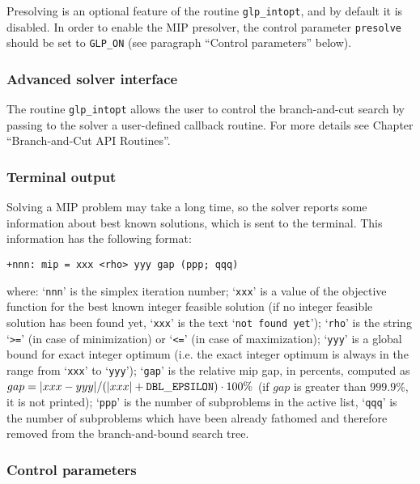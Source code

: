 Presolving is an optional feature of the routine \verb|glp_intopt|, and
by default it is disabled. In order to enable the MIP presolver, the
control parameter \verb|presolve| should be set to \verb|GLP_ON| (see
paragraph ``Control parameters'' below).

\subsubsection*{Advanced solver interface}

The routine \verb|glp_intopt| allows the user to control the
branch-and-cut search by passing to the solver a user-defined callback
routine. For more details see Chapter ``Branch-and-Cut API Routines''.

\subsubsection*{Terminal output}

Solving a MIP problem may take a long time, so the solver reports some
information about best known solutions, which is sent to the terminal.
This information has the following format:

\begin{verbatim}
+nnn: mip = xxx <rho> yyy gap (ppp; qqq)
\end{verbatim}

\noindent
where: `\verb|nnn|' is the simplex iteration number; `\verb|xxx|' is a
value of the objective function for the best known integer feasible
solution (if no integer feasible solution has been found yet,
`\verb|xxx|' is the text `\verb|not found yet|'); `\verb|rho|' is the
string `\verb|>=|' (in case of minimization) or `\verb|<=|' (in case of
maximization); `\verb|yyy|' is a global bound for exact integer optimum
(i.e. the exact integer optimum is always in the range from `\verb|xxx|'
to `\verb|yyy|'); `\verb|gap|' is the relative mip gap, in percents,
computed as $gap=|xxx-yyy|/(|xxx|+{\tt DBL\_EPSILON})\cdot 100\%$ (if
$gap$ is greater than $999.9\%$, it is not printed); `\verb|ppp|' is the
number of subproblems in the active list, `\verb|qqq|' is the number of
subproblems which have been already fathomed and therefore removed from
the branch-and-bound search tree.

\subsubsection{Control parameters}

